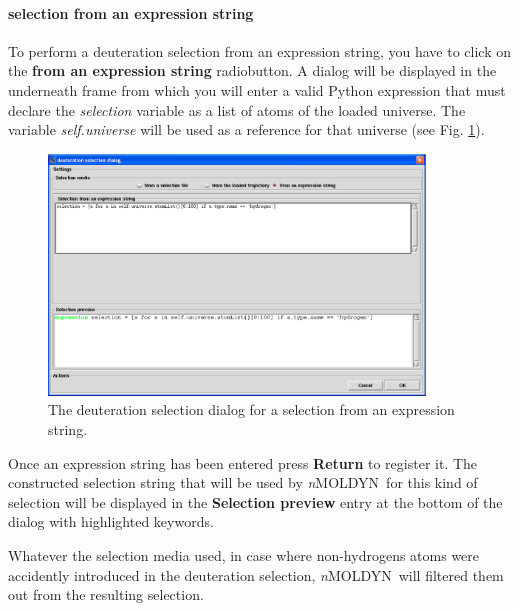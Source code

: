 \documentclass[a4paper,11pt]{report}
\newcommand{\NMOLDYN}{\textit{n}MOLDYN}
\begin{document}
\paragraph{selection from an expression string\\}
To perform a deuteration selection from an expression string, you have to click on the \textbf{from an expression string} 
radiobutton. A dialog will be displayed in the underneath frame from which you will enter a valid Python expression 
that must declare the \textit{selection} variable as a list of atoms of the loaded universe. The variable 
\textit{self.universe} will be used as a reference for that universe (see Fig. \ref{fig:deuteration_selection_from_an_expression_string}).
\begin{figure}[h!]
\begin{center}
\includegraphics[width=10cm]{Figures/deuteration_selection_from_an_expression_string.eps}
\end{center}
\caption[The deuteration selection dialog for a selection from an expression string]{The deuteration selection dialog for a selection from an expression string.}
\label{fig:deuteration_selection_from_an_expression_string}
\end{figure}   

Once an expression string has been entered press \textbf{Return} to register it. The constructed selection string that will 
be used by \NMOLDYN\ for this kind of selection will be displayed in the \textbf{Selection preview} entry at the bottom of 
the dialog with highlighted keywords.

Whatever the selection media used, in case where non-hydrogens atoms were accidently introduced in the deuteration 
selection, \NMOLDYN\ will filtered them out from the resulting selection.
\newpage
\end{document}
